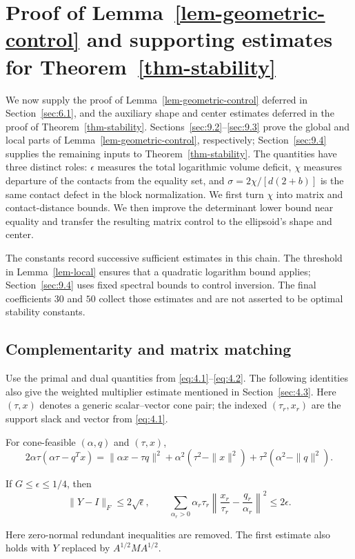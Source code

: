 \section{Proof of Lemma~\ref{lem-geometric-control} and supporting estimates for Theorem~\ref{thm-stability}}\label{sec:9}

We now supply the proof of Lemma~\ref{lem-geometric-control} deferred in Section~\ref{sec:6.1}, and the
auxiliary shape and center estimates deferred in the proof of Theorem~\ref{thm-stability}.
Sections~\ref{sec:9.2}--\ref{sec:9.3} prove the global and local parts of Lemma~\ref{lem-geometric-control}, respectively;
Section~\ref{sec:9.4} supplies the remaining inputs to Theorem~\ref{thm-stability}. The quantities have
three distinct roles: $\epsilon$ measures the total logarithmic volume deficit,
$\chi$ measures departure of the contacts from the equality set, and
$\sigma=2\chi/[d(2+b)]$ is the same contact defect in the block normalization.
We first turn $\chi$ into matrix and contact-distance bounds. We then improve
the determinant lower bound near equality and transfer the resulting matrix
control to the ellipsoid's shape and center.

The constants record successive sufficient estimates in this chain.
The threshold in Lemma~\ref{lem-local} ensures that a quadratic logarithm bound applies;
Section~\ref{sec:9.4} uses fixed spectral bounds to control inversion. The final
coefficients $30$ and $50$ collect those estimates and are not asserted to
be optimal stability constants.

\subsection{Complementarity and matrix matching}\label{sec:9.1}

Use the primal and dual quantities from \eqref{eq:4.1}--\eqref{eq:4.2}. The following identities
also give the weighted multiplier estimate mentioned in Section~\ref{sec:4.3}.
Here $(\tau,x)$ denotes a generic scalar--vector cone pair; the indexed
$(\tau_r,x_r)$ are the support slack and vector from \eqref{eq:4.1}.

\begin{proposition}\label{prop-gap-control}
For cone-feasible $(\alpha,q)$ and $(\tau,x)$,
\begin{equation}\label{eq:9.1}
2\alpha\tau(\alpha\tau-q^Tx)
=\|\alpha x-\tau q\|^2
+\alpha^2(\tau^2-\|x\|^2)+\tau^2(\alpha^2-\|q\|^2).
\end{equation}

If $G\le\epsilon\le1/4$, then
\begin{equation}\label{eq:9.2}
\|Y-I\|_F\le2\sqrt\epsilon,\qquad
\sum_{\alpha_r>0}\alpha_r\tau_r
\left\|\frac{x_r}{\tau_r}-\frac{q_r}{\alpha_r}\right\|^2
\le2\epsilon.
\end{equation}

Here zero-normal redundant inequalities are removed. The first estimate also holds with $Y$ replaced by $A^{1/2}MA^{1/2}$.

\end{proposition}

